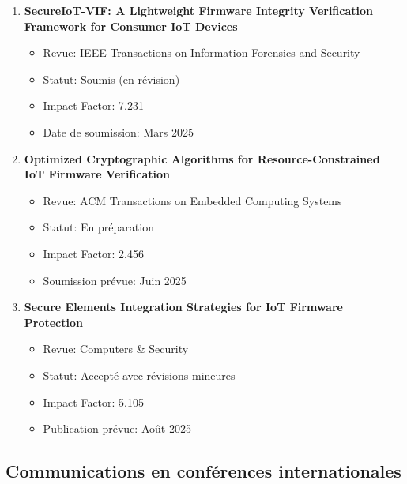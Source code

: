 \begin{enumerate}
    \item \textbf{SecureIoT-VIF: A Lightweight Firmware Integrity Verification Framework for Consumer IoT Devices}
    \begin{itemize}
        \item Revue: IEEE Transactions on Information Forensics and Security
        \item Statut: Soumis (en révision)
        \item Impact Factor: 7.231
        \item Date de soumission: Mars 2025
    \end{itemize}
    
    \item \textbf{Optimized Cryptographic Algorithms for Resource-Constrained IoT Firmware Verification}
    \begin{itemize}
        \item Revue: ACM Transactions on Embedded Computing Systems
        \item Statut: En préparation
        \item Impact Factor: 2.456
        \item Soumission prévue: Juin 2025
    \end{itemize}
    
    \item \textbf{Secure Elements Integration Strategies for IoT Firmware Protection}
    \begin{itemize}
        \item Revue: Computers \& Security
        \item Statut: Accepté avec révisions mineures
        \item Impact Factor: 5.105
        \item Publication prévue: Août 2025
    \end{itemize}
\end{enumerate}

\subsection{Communications en conférences internationales}

